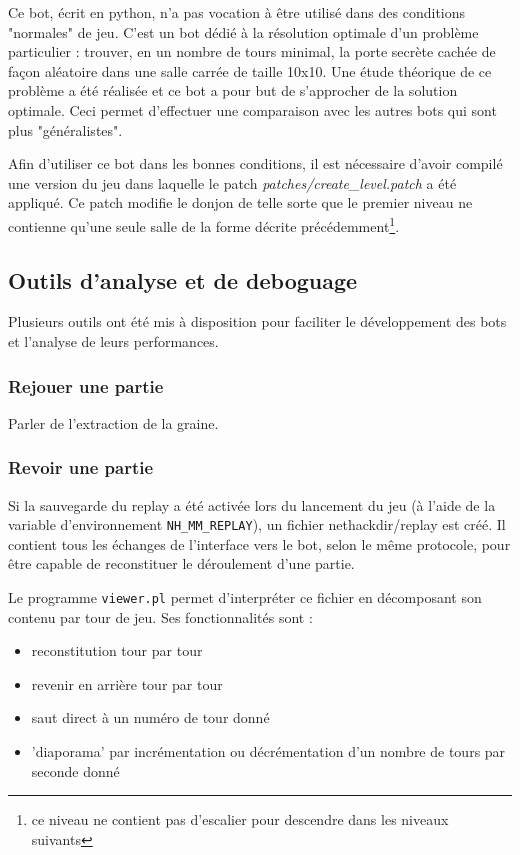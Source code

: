 \documentclass[a4paper,12pt]{article}
\begin{document}
Ce bot, écrit en python, n'a pas vocation à être utilisé dans des conditions "normales" de jeu. C'est un bot dédié à la résolution optimale d'un problème particulier : trouver, en un nombre de tours minimal, la porte secrète cachée de façon aléatoire dans une salle carrée de taille 10x10. Une étude théorique de ce problème a été réalisée et ce bot a pour but de s'approcher de la solution optimale. Ceci permet d'effectuer une comparaison avec les autres bots qui sont plus "généralistes".

Afin d'utiliser ce bot dans les bonnes conditions, il est nécessaire d'avoir compilé une version du jeu dans laquelle le patch \emph{patches/create\_level.patch} a été appliqué. Ce patch modifie le donjon de telle sorte que le premier niveau ne contienne qu'une seule salle de la forme décrite précédemment\footnote{ce niveau ne contient pas d'escalier pour descendre dans les niveaux suivants}.


\subsection{Outils d'analyse et de deboguage}

Plusieurs outils ont été mis à disposition pour faciliter le développement des bots et l'analyse de leurs performances.

\subsubsection{Rejouer une partie}

Parler de l'extraction de la graine.

\subsubsection{Revoir une partie}

	Si la sauvegarde du replay a été activée lors du lancement du jeu (à l'aide de la variable d'environnement \verb!NH_MM_REPLAY!), un fichier nethackdir/replay est créé. Il contient tous les échanges de l'interface vers le bot, selon le même protocole, pour être capable de reconstituer le déroulement d'une partie.

Le programme \verb!viewer.pl! permet d'interpréter ce fichier en décomposant son contenu par tour de jeu. Ses fonctionnalités sont :
\begin{itemize}
	\item reconstitution tour par tour
	\item revenir en arrière tour par tour
	\item saut direct à un numéro de tour donné
	\item 'diaporama' par incrémentation ou décrémentation d'un nombre de tours par seconde donné
\end{itemize}
\end{document}
